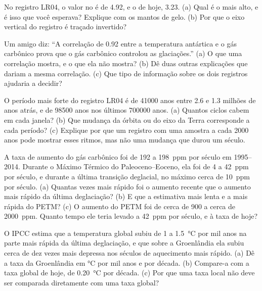 \begin{exercise}[$\star\star$]\label{exo:g12:past-climates:10}
No registro LR04, o valor no  é de
\qty{4.92}{\permil}, e o de hoje, \qty{3.23}{\permil}. (a) Qual é o mais
alto, e é isso que você esperava? Explique com os mantos de gelo. (b) Por
que o eixo vertical do registro é traçado invertido?
\end{exercise}

\begin{exercise}[$\star\star$]\label{exo:g12:past-climates:11}
Um amigo diz: ``A correlação de 0.92 entre a temperatura antártica e o gás
carbônico prova que o gás carbônico controlou as glaciações.'' (a) O que
uma correlação mostra, e o que ela não mostra? (b) Dê duas outras
explicações que dariam a mesma correlação. (c) Que tipo de informação sobre
os dois registros ajudaria a decidir?
\end{exercise}

\begin{exercise}[$\star\star\star$]\label{exo:g12:past-climates:12}
O período mais forte do registro LR04 é de \num{41000} anos entre 2.6 e 1.3
milhões de anos atrás, e de \num{98500} anos nos últimos \num{700000} anos.
(a) Quantos ciclos cabem em cada janela? (b) Que mudança da órbita ou do
eixo da Terra corresponde a cada período? (c) Explique por que um registro
com uma amostra a cada \num{2000} anos pode mostrar esses ritmos, mas não
uma mudança que durou um século.
\end{exercise}

\begin{exercise}[$\star\star\star$]\label{exo:g12:past-climates:13}
A taxa de aumento do gás carbônico foi de 192 a \qty{198}{ppm} por século em
1995--2014. Durante o Máximo Térmico do Paleoceno--Eoceno, ela foi de 4 a
\qty{42}{ppm} por século, e durante a última transição deglacial, no máximo
cerca de \qty{10}{ppm} por século. (a) Quantas vezes mais rápido foi o
aumento recente que o aumento mais rápido da última deglaciação? (b) E que
a estimativa mais lenta e a mais rápida do PETM? (c) O aumento do PETM foi
de cerca de 900 a cerca de \qty{2000}{ppm}. Quanto tempo ele teria levado a
\qty{42}{ppm} por século, e à taxa de hoje?
\end{exercise}

\begin{exercise}[$\star\star\star$]\label{exo:g12:past-climates:14}
O IPCC estima que a temperatura global subiu de 1 a
\qty{1.5}{\degreeCelsius} por mil anos na parte mais rápida da última
deglaciação, e que sobre a Groenlândia ela subiu cerca de dez vezes mais
depressa nos séculos de aquecimento mais rápido. (a) Dê a taxa da
Groenlândia em \unit{\degreeCelsius} por mil anos e por década. (b) Compare-a
com a taxa global de hoje, de \qty{0.20}{\degreeCelsius} por década. (c) Por
que uma taxa local não deve ser comparada diretamente com uma taxa global?
\end{exercise}

